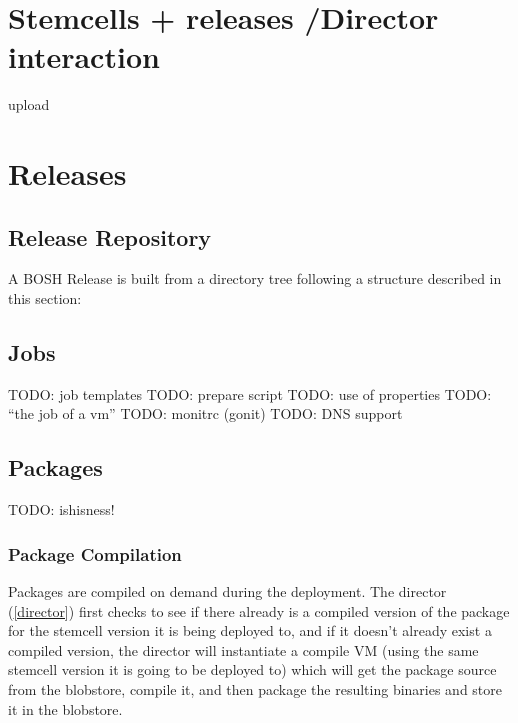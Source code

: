 \chapter{Stemcells + releases \slash  Director interaction}
\label{stemcellsreleasesdirectorinteraction}

upload

\chapter{Releases}
\label{releases}

\section{Release Repository}
\label{releaserepository}

A BOSH Release is built from a directory tree following a structure
described in this section:

\section{Jobs}
\label{jobs}

TODO: job templates
TODO: prepare script
TODO: use of properties
TODO: ``the job of a vm''
TODO: monitrc (gonit)
TODO: DNS support

\section{Packages}
\label{packages}

TODO: ishisness!

\subsection{Package Compilation}
\label{packagecompilation}

Packages are compiled on demand during the deployment. The director (\autoref{director}) first checks to see if there already is a compiled version of the package for the stemcell version it is being deployed to, and if it doesn't already exist a compiled version, the director will instantiate a compile VM (using the same stemcell version it is going to be deployed to) which will get the package source from the blobstore, compile it, and then package the resulting binaries and store it in the blobstore.


